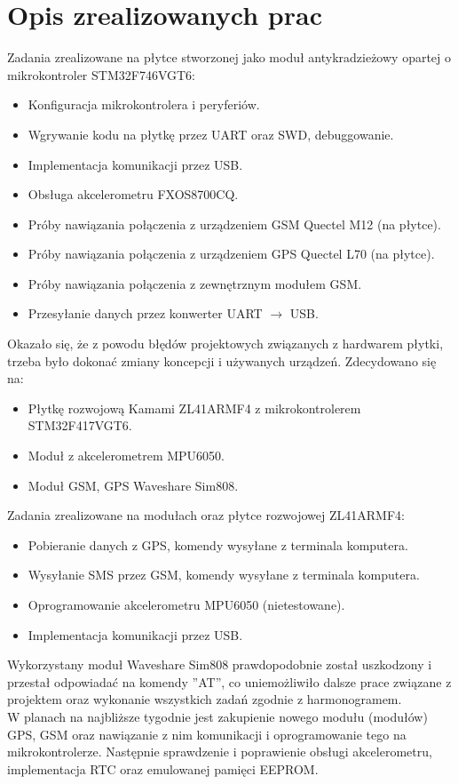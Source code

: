 \documentclass[10pt, a4paper]{article}
\begin{document}
\section{Opis zrealizowanych prac}
Zadania zrealizowane na płytce stworzonej jako moduł antykradzieżowy opartej o mikrokontroler STM32F746VGT6:
\begin{itemize}
\item Konfiguracja mikrokontrolera i peryferiów.
\item Wgrywanie kodu na płytkę przez UART oraz SWD, debuggowanie.
\item Implementacja komunikacji przez USB.
\item Obsługa akcelerometru FXOS8700CQ.
\item Próby nawiązania połączenia z urządzeniem GSM Quectel M12 (na płytce).
\item Próby nawiązania połączenia z urządzeniem GPS Quectel L70 (na płytce).
\item Próby nawiązania połączenia z zewnętrznym modułem GSM.
\item Przesyłanie danych przez konwerter UART $\rightarrow$ USB.
\end{itemize}
Okazało się, że z powodu błędów projektowych związanych z hardwarem płytki, trzeba było dokonać zmiany koncepcji i używanych urządzeń. Zdecydowano się na:
\begin{itemize}
\item Płytkę rozwojową Kamami ZL41ARMF4 z mikrokontrolerem STM32F417VGT6.
\item Moduł z akcelerometrem MPU6050.
\item Moduł GSM, GPS Waveshare Sim808.
\end{itemize}
Zadania zrealizowane na modułach oraz płytce rozwojowej ZL41ARMF4:
\begin{itemize}
\item Pobieranie danych z GPS, komendy wysyłane z terminala komputera.
\item Wysyłanie SMS przez GSM, komendy wysyłane z terminala komputera.
\item Oprogramowanie akcelerometru MPU6050 (nietestowane).
\item Implementacja komunikacji przez USB.
\end{itemize}
Wykorzystany moduł Waveshare Sim808 prawdopodobnie został uszkodzony i przestał odpowiadać na komendy ''AT'', co uniemożliwiło dalsze prace związane z projektem oraz wykonanie wszystkich zadań zgodnie z harmonogramem.\\
W planach na najbliższe tygodnie jest zakupienie nowego modułu (modułów) GPS, GSM oraz nawiązanie z nim komunikacji i oprogramowanie tego na mikrokontrolerze. Następnie sprawdzenie i poprawienie obsługi akcelerometru, implementacja RTC oraz emulowanej pamięci EEPROM.
\end{document}
